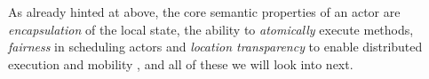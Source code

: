 As already hinted at above, the core semantic properties of an actor are \textit{encapsulation} of the local state, the ability to \textit{atomically} execute methods, \textit{fairness} in scheduling actors and \textit{location transparency} to enable distributed execution and mobility \cite{ActorModelPaper}, and all of these we will look into next.
 

